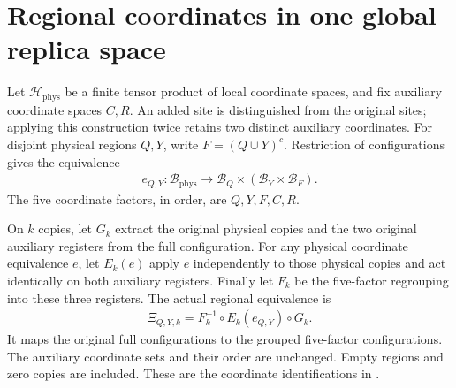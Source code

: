 \section{Regional coordinates in one global replica space}
\label{sec:regional_five_factor_coordinates}

\begin{definition}
\label{def:regional_five_factor_coordinates}
\leanok
Let $\mathcal H_{\mathrm{phys}}$ be a finite tensor product of local
coordinate spaces, and fix auxiliary coordinate spaces $C,R$.
An added site is distinguished from the original sites; applying this
construction twice retains two distinct auxiliary coordinates.
For disjoint physical regions $Q,Y$, write $F=(Q\cup Y)^c$.
Restriction of configurations gives the equivalence
\begin{align}
 e_{Q,Y}:\mathcal B_{\mathrm{phys}}
   \longrightarrow\mathcal B_Q\times(\mathcal B_Y\times\mathcal B_F).
\end{align}
The five coordinate factors, in order, are $Q,Y,F,C,R$.

On $k$ copies, let $G_k$ extract the original physical copies and the
two original auxiliary registers from the full configuration. For any
physical coordinate equivalence $e$, let $E_k(e)$ apply $e$ independently
to those physical copies and act identically on both auxiliary registers.
Finally let $F_k$ be the five-factor regrouping into these three registers.
The actual regional equivalence is
\begin{align}
 \Xi_{Q,Y,k}=F_k^{-1}\circ E_k(e_{Q,Y})\circ G_k.
\end{align}
It maps the original full configurations to the grouped five-factor
configurations. The auxiliary coordinate sets and their order are
unchanged. Empty regions and zero copies are included. These are the
coordinate identifications in
\cite[Section~8, lines~20--37 and~80--110]{OpenAI2026AreaLaw}.
\end{definition}
